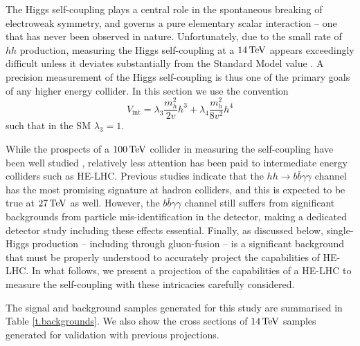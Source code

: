 \label{sec:Homilleretal}



The Higgs self-coupling plays a central role in the spontaneous breaking of electroweak symmetry, and governs a pure elementary scalar interaction -- one that has never been observed in nature. Unfortunately, due to the small rate of $hh$ production, measuring the Higgs self-coupling at a $14\, {\rm \text{TeV}}$ appears exceedingly difficult unless it deviates substantially from the Standard Model value \cite{ATL-PHYS-PUB-2014-019, ATL-PHYS-PUB-2017-001}. A precision measurement of the Higgs self-coupling is thus one of the primary goals of any higher energy collider.  In this section we use the convention
\begin{equation}\label{eq:v_int}
  V_{\text{int}} = \lambda_3\frac{m_h^2}{2v}h^3 + \lambda_4\frac{m_h^2}{8v^2}h^4
\end{equation}
such that in the SM $\lambda_3=1$.

While the prospects of a $100\, {\rm \text{TeV}}$ collider in measuring the self-coupling have been well studied \cite{Contino:2016spe}, relatively less attention has been paid to intermediate energy colliders such as HE-LHC. Previous studies indicate that the $hh\rightarrow b\bar{b}\gamma\gamma$ channel has the most promising signature at hadron colliders, and this is expected to be true at $27\, {\rm \text{TeV}}$ as well. However, the $b\bar{b}\gamma\gamma$ channel still suffers from significant backgrounds from particle mis-identification in the detector, making a dedicated detector study including these effects essential. Finally, as discussed below, single-Higgs production -- including through gluon-fusion -- is a significant background that must be properly understood to accurately project the capabilities of HE-LHC. In what follows, we present a projection of the capabilities of a HE-LHC to measure the self-coupling with these intricacies carefully considered.


The signal and background samples generated for this study are summarised in Table \ref{t.backgrounds}. We also show the cross sections of $14\, {\rm \text{TeV}}$ samples generated for validation with previous projections. 

